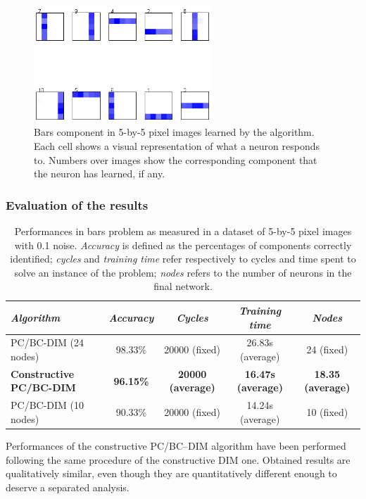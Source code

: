 \documentclass[11pt,a4paper]{report}
\begin{document}
					\begin{figure}[h]
						\centering
						\includegraphics[width=0.6\textwidth]{bars}
						\caption[Bars component in 5-by-5 pixel images learned by the algorithm.]{Bars component in 5-by-5 pixel images learned by the algorithm. Each cell shows a visual representation of what a neuron responds to. Numbers over images show the corresponding component that the neuron has learned, if any.}
						\label{fig:bars}
					\end{figure}
					
				\subsubsection{Evaluation of the results}
\begin{table}[h]
	\centering
	\begin{adjustbox}{width=1\textwidth}
	\begin{tabular}{l*{4}{|c}}
		\emph{Algorithm}                & \emph{Accuracy}  & \emph{Cycles}            & \emph{Training time}      & \emph{Nodes}             \\
		\hline
		PC/BC-DIM (24 nodes)            & 98.33\%          & 20000 (fixed)            & 26.83s (average)          & 24 (fixed)               \\
		\textbf{Constructive PC/BC-DIM} & \textbf{96.15\%} & \textbf{20000 (average)} & \textbf{16.47s (average)} & \textbf{18.35 (average)} \\
		PC/BC-DIM (10 nodes)            & 90.33\%          & 20000 (fixed)            & 14.24s (average)          & 10 (fixed)               \\
	\end{tabular}
	\end{adjustbox}
	\caption[Performances in bars problem as measured in a dataset of 5-by-5 pixel images with 0.1 noise.]{Performances in bars problem as measured in a dataset of 5-by-5 pixel images with 0.1 noise. \emph{Accuracy} is defined as the percentages of components correctly identified; \emph{cycles} and \emph{training time} refer respectively to cycles and time spent to solve an instance of the problem; \emph{nodes} refers to the number of neurons in the final network.}
	\label{tab:performance2}
\end{table}
				Performances of the constructive PC/BC--DIM algorithm have been performed following the same procedure of the constructive DIM one. Obtained results are qualitatively similar, even though they are quantitatively different enough to deserve a separated analysis.
				
\end{document}
